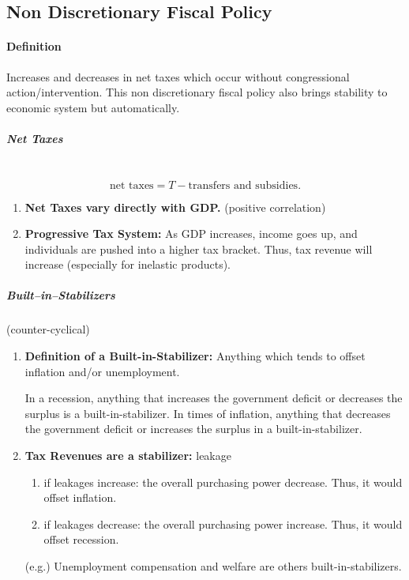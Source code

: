 
\subsection{Non Discretionary Fiscal Policy}

\paragraph{Definition} Increases and decreases in net taxes which occur without congressional action/intervention.
This non discretionary fiscal policy also brings stability to economic system but automatically.

\subparagraph{Net Taxes}\
\[
	\text{net taxes} = T - \text{transfers and subsidies}.
\]

\begin{enumerate}[label = (\alph*)]
	\item \textbf{Net Taxes vary directly with GDP.} (positive correlation)
	\item \textbf{Progressive Tax System:} As GDP increases, income goes up, and individuals are pushed into a higher tax bracket. Thus, tax revenue will increase (especially for inelastic products).
\end{enumerate}

\subparagraph{Built--in--Stabilizers} (counter-cyclical)
\begin{enumerate}[label = \textbullet]
	\item \textbf{Definition of a Built-in-Stabilizer:} Anything which tends to offset inflation and/or unemployment.

	In a recession, anything that increases the government deficit or decreases the surplus is a built-in-stabilizer. In times of inflation, anything that decreases the government deficit or increases the surplus in a built-in-stabilizer.

	\item \textbf{Tax Revenues are a stabilizer:} leakage
		\begin{enumerate}[label = \textbullet]
			\item if leakages increase: the overall purchasing power decrease. Thus, it would offset inflation.
			\item if leakages decrease: the overall purchasing power increase. Thus, it would offset recession.
		\end{enumerate}

	\item[(e.g.)] Unemployment compensation and welfare are others built-in-stabilizers.
\end{enumerate}

